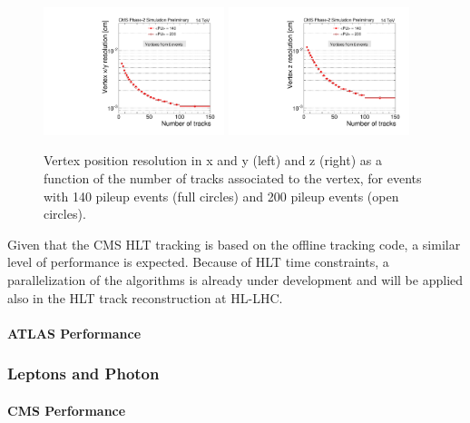 \begin{figure}[h!tbp]
\begin{center}
  \includegraphics[width=0.47\textwidth]{figures/cmsupgrade/TDR-17-001_fig6_13_a_RecoAllAssoc2GenMatched_ResolX_vs_NumTracks_Sigma_PU.pdf} \hfill
  \includegraphics[width=0.47\textwidth]{figures/cmsupgrade/TDR-17-001_fig6_13_b_RecoAllAssoc2GenMatched_ResolZ_vs_NumTracks_Sigma_PU.pdf}
  \caption{Vertex position resolution in x and y (left) and z (right) as a function of the number of tracks associated to the vertex, for \ttbar events with 140 pileup events (full circles) and 200 pileup events (open circles). 
 }
  \label{fig:cmsvertex}
\end{center}
\end{figure}


Given that the CMS HLT tracking is based on the offline tracking code, a similar level of performance is expected.
Because of HLT time constraints, a parallelization of the algorithms is already under development and will be applied also in the HLT track reconstruction at HL-LHC.

\paragraph{ATLAS Performance}


\subsubsection{Leptons and Photon}

\paragraph{CMS Performance} 

